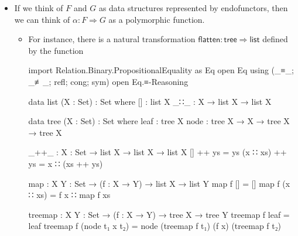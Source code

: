 \documentclass{lecturenotes}
\begin{document}
\begin{itemize}
\item If we think of $F$ and $G$ as data structures represented by endofunctors, then we can think of $\alpha : F \Rightarrow G$ as a polymorphic function.
  \begin{itemize}
  \item For instance, there is a natural transformation $\textsf{flatten} : \textsf{tree} \Rightarrow \textsf{list}$ defined by the function
    \begin{code}[hide]
      import Relation.Binary.PropositionalEquality as Eq
      open Eq using (_≡_; _≢_; refl; cong; sym)
      open Eq.≡-Reasoning

      data list (X : Set) : Set where
        [] : list X
        _∷_ : X → list X → list X

      data tree (X : Set) : Set where
        leaf : tree X
        node : tree X → X → tree X → tree X

      _++_ : {X : Set}  → list X → list X → list X
      [] ++ ys = ys
      (x ∷ xs) ++ ys = x ∷ (xs ++ ys)

      map : {X Y : Set} → (f : X → Y) → list X → list Y
      map f [] = []
      map f (x ∷ xs) = f x ∷ map f xs

      treemap : {X Y : Set} → (f : X → Y) → tree X → tree Y
      treemap f leaf = leaf
      treemap f (node t₁ x t₂) = node (treemap f t₁) (f x) (treemap f t₂)


\end{code}
\end{itemize}
\end{itemize}
\end{document}
